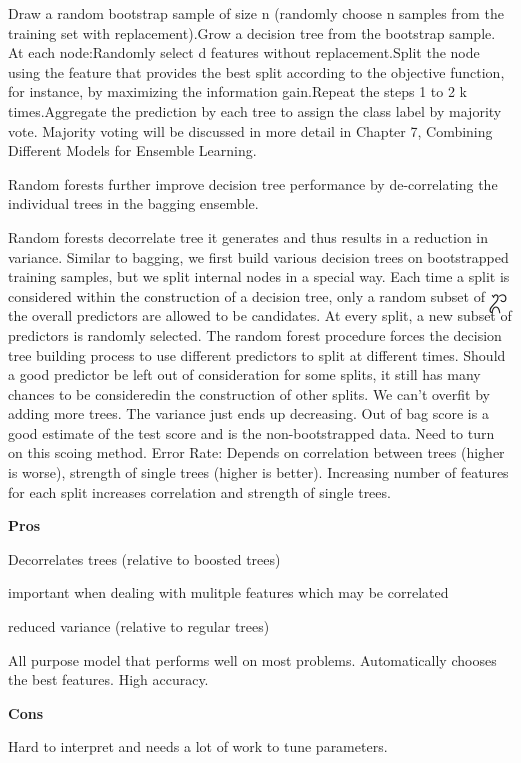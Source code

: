 \documentclass[]{book}
\begin{document}
Draw a random bootstrap sample of size n (randomly choose n samples from the training set with replacement).Grow a decision tree from the bootstrap sample. At each node:Randomly select d features without replacement.Split the node using the feature that provides the best split according to the objective function, for instance, by maximizing the information gain.Repeat the steps 1 to 2 k times.Aggregate the prediction by each tree to assign the class label by majority vote. Majority voting will be discussed in more detail in Chapter 7, Combining Different Models for Ensemble Learning.

Random forests further improve decision tree performance by de-correlating the individual trees in the bagging ensemble.

Random forests decorrelate tree it generates and thus results in a reduction in variance. Similar to bagging, we first build various decision trees on bootstrapped training samples, but we split internal nodes in a special way. Each time a split is considered within the construction of a decision tree, only a random subset of ᬊthe overall predictors are allowed to be candidates. At every split, a new subset of predictors is randomly selected. The random forest procedure forces the decision tree building process to use different predictors to split at different times. Should a good predictor be left out of consideration for some splits, it still has many chances to be consideredin the construction of other splits. We can't overfit by adding more trees. The variance just ends up decreasing. Out of bag score is a good estimate of the test score and is the non-bootstrapped data. Need to turn on this scoing method.
Error Rate: Depends on correlation between trees (higher is worse), strength of single trees (higher is better). Increasing number of features for each split increases correlation and strength of single trees.

\textbf{Pros}

Decorrelates trees (relative to boosted trees)

important when dealing with mulitple features which may be correlated

reduced variance (relative to regular trees)

All purpose model that performs well on most problems. Automatically chooses the best features. High accuracy.

\textbf{Cons}

Hard to interpret and needs a lot of work to tune parameters.
\end{document}
